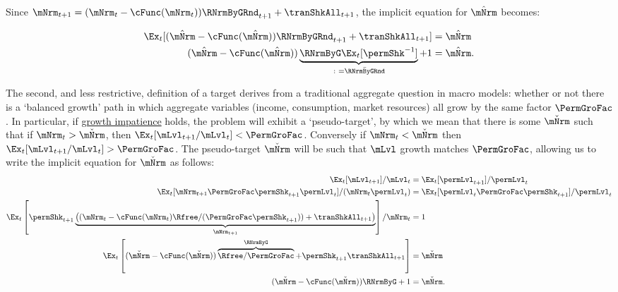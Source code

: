 \documentclass[BufferStockTheory]{subfiles}
\begin{document}


\hypertarget{mTargImplicit}{}
Since $\mNrm_{t+1}= (\mNrm_{t}-\cFunc(\mNrm_{t}))\RNrmByGRnd_{t+1}  +\tranShkAll_{t+1}$, the implicit equation for $\mTrgNrm$ becomes:

%
\begin{equation} \label{eq:mTargImplicit}
  \begin{aligned}
    \Ex_{t} [(\mTrgNrm-\cFunc(\mTrgNrm))\RNrmByGRnd_{t+1}+\tranShkAll_{t+1}] & = \mTrgNrm     \\   (\mTrgNrm-\cFunc(\mTrgNrm))\underbrace{\RNrmByG\Ex_{t}[\permShk^{-1}]}_{\colon = \bar{\RNrmByGRnd}}+1 & = \mTrgNrm .
  \end{aligned}
\end{equation}

\hypertarget{Collective-Stability}{}
\hypertarget{pseudo-steady-state}{}




The second, and less restrictive, definition of a target derives from a traditional aggregate question in macro models: whether or not there is a `balanced growth' path in which aggregate variables (income, consumption, market resources) all grow by the same factor $\PermGroFac$.
In particular, if \hyperlink{GIC}{growth impatience} holds, the problem will exhibit a `pseudo-target', by which we mean that there is some ${\mBalLvl}$ such that if $\mNrm_{t}>{\mBalLvl}$, then $\Ex_{t}[\mLvl_{t+1}/\mLvl_{t}] < \PermGroFac$.\hypertarget{balgrostable}{}
\hypertarget{balgrostableSolve}{}
Conversely if $\mNrm_{t}<{\mBalLvl}$ then $\Ex_{t}[\mLvl_{t+1}/\mLvl_{t}] > \PermGroFac$.
The pseudo-target $\mBalLvl$ will be such that $\mLvl$ growth matches $\PermGroFac$, allowing us to write the implicit equation for $\mBalLvl$ as follows:
%
\begin{equation}\label{eq:balgrostable}
  \begin{aligned}
    \Ex_{t}[\mLvl_{t+1}]/\mLvl_{t} & =\Ex_{t}[\permLvl_{t+1}]/\permLvl_{t}
    \\  \Ex_{t}[\mNrm_{t+1}\PermGroFac\permShk_{t+1}\permLvl_{t}]/(\mNrm_{t}\permLvl_{t}) & =\Ex_{t}[\permLvl_{t}\PermGroFac\permShk_{t+1}]/\permLvl_{t}
    \\ \Ex_{t}\left[\permShk_{t+1}\underbrace{\left((\mNrm_{t}-\usual{\cFunc}(\mNrm_{t})\Rfree/(\PermGroFac\permShk_{t+1}))+\tranShkAll_{t+1}\right)}_{\mNrm_{t+1}}\right]/\mNrm_{t} & = 1
    \\ 
    \Ex_{t}\left[(\mBalLvl-\usual{\cFunc}(\mBalLvl))\overbrace{\Rfree/\PermGroFac}^{\RNrmByG}+\permShk_{t+1}\tranShkAll_{t+1}\right] & = \mBalLvl
    \\  (\mBalLvl-\usual{\cFunc}(\mBalLvl))\RNrmByG + 1 & = \mBalLvl .
  \end{aligned}
\end{equation}
\end{document}
